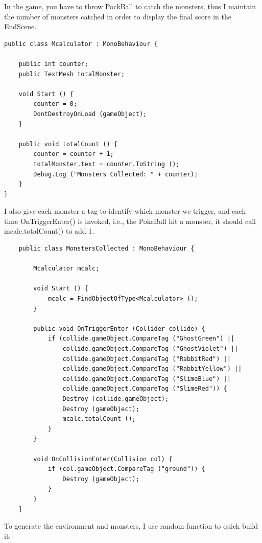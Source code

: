 \documentclass{article}
\begin{document}
In the game, you have to throw PockBall to catch the monsters, thus I maintain the number of monsters catched in order to display the final score in the EndScene.

\begin{lstlisting}
public class Mcalculator : MonoBehaviour {

	public int counter;
	public TextMesh totalMonster;

	void Start () {
		counter = 0;
		DontDestroyOnLoad (gameObject);
    }

	public void totalCount () {
		counter = counter + 1;
		totalMonster.text = counter.ToString ();
		Debug.Log ("Monsters Collected: " + counter);
	}
}
\end{lstlisting}

I also give each monster a tag to identify which monster we trigger, and each time OnTriggerEnter() is invoked, i.e., the PokeBall hit a monster, it should call mcalc.totalCount() to add 1.

\begin{lstlisting}
    public class MonstersCollected : MonoBehaviour {

        Mcalculator mcalc;
    
        void Start () {
            mcalc = FindObjectOfType<Mcalculator> ();
        }
        
        public void OnTriggerEnter (Collider collide) {
            if (collide.gameObject.CompareTag ("GhostGreen") ||
                collide.gameObject.CompareTag ("GhostViolet") ||
                collide.gameObject.CompareTag ("RabbitRed") ||
                collide.gameObject.CompareTag ("RabbitYellow") ||
                collide.gameObject.CompareTag ("SlimeBlue") ||
                collide.gameObject.CompareTag ("SlimeRed")) {
                Destroy (collide.gameObject);
                Destroy (gameObject);
                mcalc.totalCount ();
            }
        }
    
        void OnCollisionEnter(Collision col) {
            if (col.gameObject.CompareTag ("ground")) {
                Destroy (gameObject);
            }
        }
    }
\end{lstlisting}

To generate the environment and monsters, I use random function to quick build it:
\end{document}
